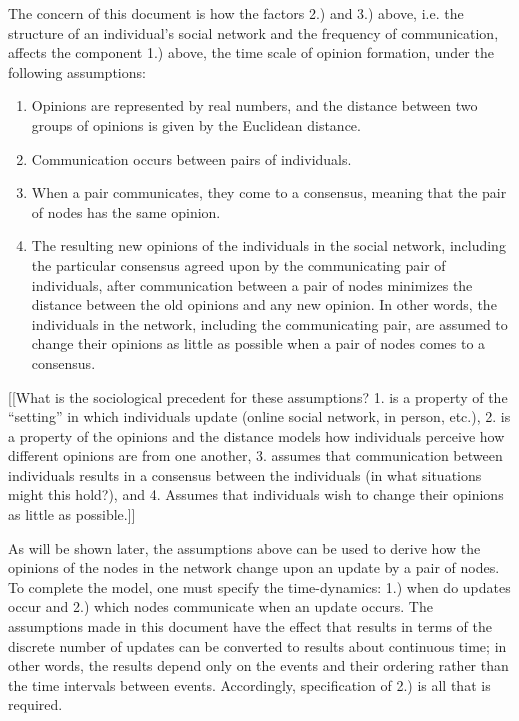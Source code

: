 \documentclass{amsart}
\theoremstyle{remark}
\begin{document}
The concern of this document is how the factors 2.) and 3.) above, i.e. the structure of an individual's social network and the frequency of communication, affects the component 1.) above, the time scale of opinion formation, under the following assumptions:
\begin{enumerate}[label=\textbf{A\arabic*}]
	\item Opinions are represented by real numbers, and the distance between two groups of opinions is given by the Euclidean distance.\label{enum:ass1}
	\item Communication occurs between pairs of individuals.\label{enum:ass2}
	\item When a pair communicates, they come to a consensus, meaning that the pair of nodes has the same opinion.\label{enum:ass3}
	\item The resulting new opinions of the individuals in the social network, including the particular consensus agreed upon by the communicating pair of individuals, after communication between a pair of nodes minimizes the distance between the old opinions and any new opinion. In other words, the individuals in the network, including the communicating pair, are assumed to change their opinions as little as possible when a pair of nodes comes to a consensus.\label{enum:ass4} 
\end{enumerate}
[[What is the sociological precedent for these assumptions? 1. is a property of the ``setting'' in which individuals update (online social network, in person, etc.), 2. is a property of the opinions and the distance models how individuals perceive how different opinions are from one another, 3. assumes that communication between individuals results in a consensus between the individuals (in what situations might this hold?), and 4. Assumes that individuals wish to change their opinions as little as possible.]]

As will be shown later, the assumptions above can be used to derive how the opinions of the nodes in the network change upon an update by a pair of nodes. To complete the model, one must specify the time-dynamics: 1.) when do updates occur and 2.) which nodes communicate when an update occurs. The assumptions made in this document have the effect that results in terms of the discrete number of updates can be converted to results about continuous time; in other words, the results depend only on the events and their ordering rather than the time intervals between events. Accordingly, specification of 2.) is all that is required.    
\end{document}
